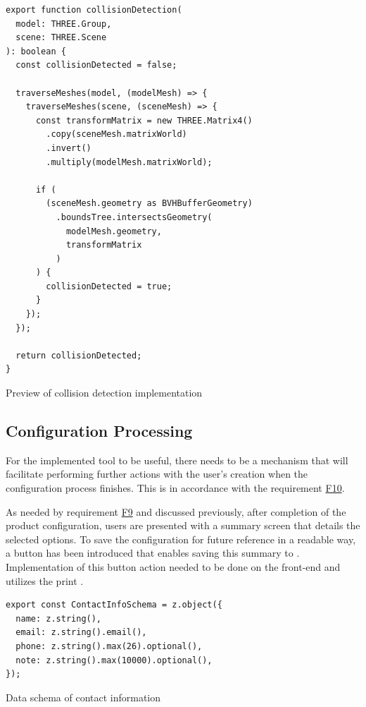 \begin{listing}[h]
\begin{verbatim}
export function collisionDetection(
  model: THREE.Group,
  scene: THREE.Scene
): boolean {
  const collisionDetected = false;

  traverseMeshes(model, (modelMesh) => {
    traverseMeshes(scene, (sceneMesh) => {
      const transformMatrix = new THREE.Matrix4()
        .copy(sceneMesh.matrixWorld)
        .invert()
        .multiply(modelMesh.matrixWorld);

      if (
        (sceneMesh.geometry as BVHBufferGeometry)
          .boundsTree.intersectsGeometry(
            modelMesh.geometry,
            transformMatrix
          )
      ) {
        collisionDetected = true;
      }
    });
  });

  return collisionDetected;
}
\end{verbatim}
\caption{Preview of collision detection implementation}
\label{lisiting:impl-collisiondetection}
\end{listing}


\subsection{Configuration Processing}

For the implemented tool to be useful, there needs to be a mechanism that will facilitate performing further actions with the user's creation when the configuration process finishes. This is in accordance with the requirement \hyperref[itm:F10]{F10}.

As needed by requirement \hyperref[itm:F9]{F9} and discussed previously, after completion of the product configuration, users are presented with a summary screen that details the selected options. To save the configuration for future reference in a readable way, a button has been introduced that enables saving this summary to . Implementation of this button action needed to be done on the front-end and utilizes the  print .

\begin{listing}[h]
\begin{verbatim}
export const ContactInfoSchema = z.object({
  name: z.string(),
  email: z.string().email(),
  phone: z.string().max(26).optional(),
  note: z.string().max(10000).optional(),
});
\end{verbatim}
\caption{Data schema of contact information}
\label{listing:schema-contactinformation}
\end{listing}

